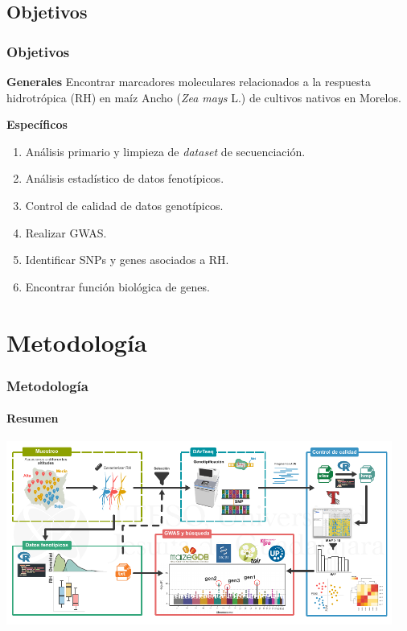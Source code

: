 \documentclass[9pt,aspectratio=169]{beamer}
\newcommand{\usageitem}[1]{
  \item[ {\makebox[2em]{\strut #1}} ]
}
\newcommand{\objetivo}{ \usageitem{\centering\color{ITESOblue}\faBullseye} }
\begin{document}
\subsection{Objetivos}
\begin{frame}
    \frametitle{Objetivos}

    \begin{block}{\bfseries\faBullseye\hspace{0.5em}\LARGE Generales}
        {\Large Encontrar marcadores moleculares relacionados a la respuesta hidrotrópica (RH) en maíz Ancho (\textit{Zea mays} L.) de cultivos nativos en Morelos.}
    \end{block}

    \bigskip

    {\LARGE\bfseries\color{ITESOblue} Específicos}\\ \medskip 
    {\large
        \begin{multicols}{2}
            \begin{enumerate}[itemsep=6pt,topsep=6pt]
                \objetivo Análisis primario y limpieza de \textit{dataset} de secuenciación.
                \objetivo Análisis estadístico de datos fenotípicos.
                \objetivo Control de calidad de datos genotípicos.
                \objetivo Realizar GWAS.
                \objetivo Identificar SNPs y genes asociados a RH.
                \objetivo Encontrar función biológica de genes.
            \end{enumerate}
        \end{multicols}
    }

\end{frame}

\section{Metodología}

\begin{frame}
    \frametitle{Metodología}
    \framesubtitle{Resumen}
    \begin{center}
        \includegraphics[width=0.95\textwidth]{metodologia-resumen.pdf}
    \end{center}
\end{frame}
\end{document}

